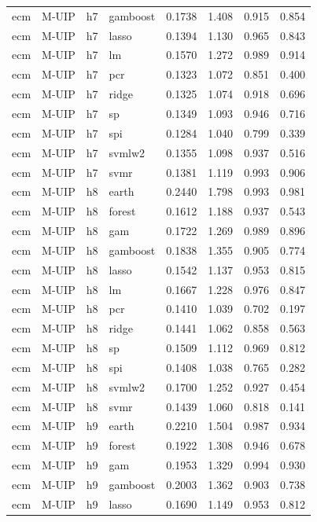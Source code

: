 \begin{ThreePartTable}
\begin{longtable}[t]{llclcccc}
ecm & M-UIP & h7 & gamboost & 0.1738 & 1.408 & 0.915 & 0.854\\
ecm & M-UIP & h7 & lasso & 0.1394 & 1.130 & 0.965 & 0.843\\
ecm & M-UIP & h7 & lm & 0.1570 & 1.272 & 0.989 & 0.914\\
ecm & M-UIP & h7 & pcr & 0.1323 & 1.072 & 0.851 & 0.400\\
ecm & M-UIP & h7 & ridge & 0.1325 & 1.074 & 0.918 & 0.696\\
ecm & M-UIP & h7 & sp & 0.1349 & 1.093 & 0.946 & 0.716\\
ecm & M-UIP & h7 & spi & 0.1284 & 1.040 & 0.799 & 0.339\\
ecm & M-UIP & h7 & svmlw2 & 0.1355 & 1.098 & 0.937 & 0.516\\
ecm & M-UIP & h7 & svmr & 0.1381 & 1.119 & 0.993 & 0.906\\
\addlinespace
ecm & M-UIP & h8 & earth & 0.2440 & 1.798 & 0.993 & 0.981\\
ecm & M-UIP & h8 & forest & 0.1612 & 1.188 & 0.937 & 0.543\\
ecm & M-UIP & h8 & gam & 0.1722 & 1.269 & 0.989 & 0.896\\
ecm & M-UIP & h8 & gamboost & 0.1838 & 1.355 & 0.905 & 0.774\\
ecm & M-UIP & h8 & lasso & 0.1542 & 1.137 & 0.953 & 0.815\\
ecm & M-UIP & h8 & lm & 0.1667 & 1.228 & 0.976 & 0.847\\
ecm & M-UIP & h8 & pcr & 0.1410 & 1.039 & 0.702 & 0.197\\
ecm & M-UIP & h8 & ridge & 0.1441 & 1.062 & 0.858 & 0.563\\
ecm & M-UIP & h8 & sp & 0.1509 & 1.112 & 0.969 & 0.812\\
ecm & M-UIP & h8 & spi & 0.1408 & 1.038 & 0.765 & 0.282\\
ecm & M-UIP & h8 & svmlw2 & 0.1700 & 1.252 & 0.927 & 0.454\\
ecm & M-UIP & h8 & svmr & 0.1439 & 1.060 & 0.818 & 0.141\\
\addlinespace
ecm & M-UIP & h9 & earth & 0.2210 & 1.504 & 0.987 & 0.934\\
ecm & M-UIP & h9 & forest & 0.1922 & 1.308 & 0.946 & 0.678\\
ecm & M-UIP & h9 & gam & 0.1953 & 1.329 & 0.994 & 0.930\\
ecm & M-UIP & h9 & gamboost & 0.2003 & 1.362 & 0.903 & 0.738\\
ecm & M-UIP & h9 & lasso & 0.1690 & 1.149 & 0.953 & 0.812\\

\end{longtable}
\end{ThreePartTable}
